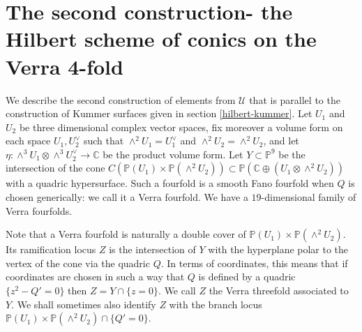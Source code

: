 \documentclass[a4paper,11pt]{amsart}
\theoremstyle{definition}
\numberwithin{equation}{section}
\numberwithin{equation}{section} \theoremstyle{definition}
\begin{document}
 
 
 
  
  

 
 
 
\section{The second construction- the Hilbert scheme of conics on the Verra 4-fold}\label{F-Verra}
We describe the second construction of elements from $\mathcal{U}$ that is parallel to the construction of Kummer surfaces given in section \ref{hilbert-kummer}.
Let $U_1$ and $U_2$ be three dimensional complex vector spaces, 
 fix moreover a volume form on each space $U_1, U_2^\vee$ such that 
$\wedge^2U_1=U_1^{\vee}$ and $\wedge^2U_2=\wedge^2 U_2$, and let $\eta:\wedge^3 U_1\otimes \wedge^3 U_2^\vee\to {{\mathbb{C}  }}$ be the product volume form.
Let $Y\subset {{\mathbb{P}}}^9$ be the intersection of the cone $C({{\mathbb{P}}}(U_1)\times {{\mathbb{P}}}(\wedge^2 U_2))\subset {{\mathbb{P}}}({{\mathbb{C}  }}\oplus (U_1\otimes \wedge^2 U_2))$ with a quadric hypersurface.
Such a fourfold is a smooth Fano fourfold when $Q$ is chosen generically: we call it a Verra fourfold. We have a $19$-dimensional family of Verra fourfolds.

Note that a Verra fourfold is naturally a double cover of ${{\mathbb{P}}}(U_1)\times {{\mathbb{P}}}(\wedge^2 U_2)$.  Its ramification locus $Z$ is the intersection 
of $Y$ with the hyperplane polar to the vertex of the cone via the quadric $Q$. In terms of coordinates, this means that if coordinates are chosen in such a way that $Q$ is defined by a quadric $\{z^2-Q'=0\}$ then $Z=Y\cap \{z=0\}$. We call $Z$ the Verra threefold associated to $Y$. We shall sometimes also identify $Z$ with the branch locus ${{\mathbb{P}}}(U_1)\times {{\mathbb{P}}}(\wedge^2 U_2)\cap \{Q'=0\}$. 
\end{document}
